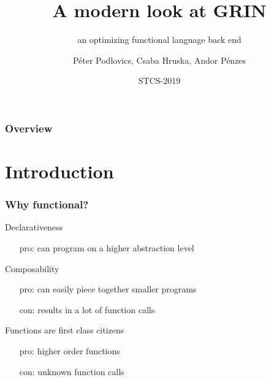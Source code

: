 \documentclass[bigger]{beamer}
\title[GRIN] %
{A modern look at GRIN}
\subtitle{an optimizing functional language back end}
\author[P. Podlovics, Cs. Hruska, A. Pénzes ] %
{Péter Podlovics, Csaba Hruska, Andor Pénzes}
\institute[ELTE] %
{
	Eötvös Loránd University (ELTE), \\ Budapest, Hungary
}
\date{STCS-2019} %
\begin{document}
	
{
	\frame{\vspace{15mm}\titlepage}
}

\begin{frame}
	\frametitle{Overview}
	\tableofcontents
\end{frame}


\section{Introduction}

\begin{frame}[fragile]
	\frametitle{Why functional?}
	
	\begin{vfitemize}
		\item Declarativeness
			\begin{itemize}
				\item[pro:] can program on a higher abstraction level
			\end{itemize}
		\item Composability\\
			\begin{itemize}
				\item[pro:] can easily piece together smaller programs
				\item[con:] results in a lot of function calls
			\end{itemize}
		\item Functions are first class citizens
			\begin{itemize}
				\item[pro:] higher order functions
				\item[con:] unknown function calls
			\end{itemize}
	\end{vfitemize}

\end{frame}
\end{document}
